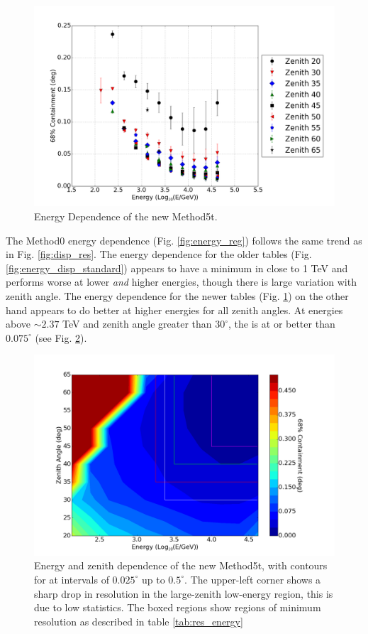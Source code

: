 \documentclass[main.tex]{subfiles}
\begin{document}
\begin{figure}[htbp]
  \centering
  \includegraphics[width=.9\linewidth]{images/disp_450_energy}
  \caption{Energy Dependence of the new Method5t.}
  \label{fig:energy_disp_450}    
\end{figure}

The Method0 energy dependence (Fig. \ref{fig:energy_reg}) follows the same trend as in Fig. \ref{fig:disp_res}. The energy dependence for the older \disp tables (Fig. \ref{fig:energy_disp_standard}) appears to have a minimum in \rse close to 1 TeV and performs worse at lower \textit{and} higher energies, though there is large variation with zenith angle. The energy dependence for the newer \disp tables (Fig. \ref{fig:energy_disp_450}) on the other hand appears to do better at higher energies for all zenith angles. At energies above $\sim 2.37$ TeV and zenith angle greater than $30^\circ$, the \rse is at or better than $0.075^\circ$ (see Fig. \ref{fig:energy_new_contour}).

\begin{figure}[htbp]
  \centering
  \includegraphics[width=.9\linewidth]{images/disp_450x4size_contour}
  \caption[Energy and zenith dependence of the new Method5t.]{Energy and zenith dependence of the new Method5t, with contours for \rse at intervals of $0.025^\circ$ up to $0.5^\circ$. The upper-left corner shows a sharp drop in resolution in the large-zenith low-energy region, this is due to low statistics. The boxed regions show regions of minimum resolution as described in table \ref{tab:res_energy}}
  \label{fig:energy_new_contour}
\end{figure}
\end{document}
